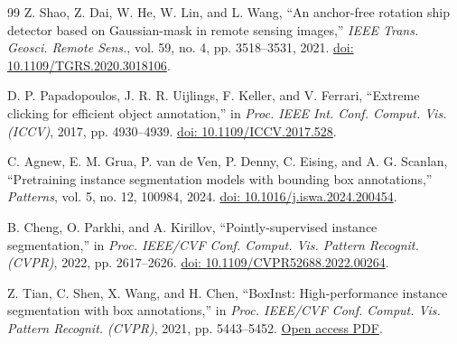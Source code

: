 \documentclass[twocolumn, 10pt]{article}
\begin{document}
\begin{thebibliography}{99}
Z. Shao, Z. Dai, W. He, W. Lin, and L. Wang, “An anchor-free rotation ship detector based on Gaussian-mask in remote sensing images,” \textit{IEEE Trans. Geosci. Remote Sens.}, vol. 59, no. 4, pp. 3518–3531, 2021. \href{https://doi.org/10.1109/TGRS.2020.3018106}{doi: 10.1109/TGRS.2020.3018106}.

D. P. Papadopoulos, J. R. R. Uijlings, F. Keller, and V. Ferrari, “Extreme clicking for efficient object annotation,” in \textit{Proc. IEEE Int. Conf. Comput. Vis. (ICCV)}, 2017, pp. 4930–4939. \href{https://doi.org/10.1109/ICCV.2017.528}{doi: 10.1109/ICCV.2017.528}.

C. Agnew, E. M. Grua, P. van de Ven, P. Denny, C. Eising, and A. G. Scanlan, “Pretraining instance segmentation models with bounding box annotations,” \textit{Patterns}, vol. 5, no. 12, 100984, 2024. \href{https://doi.org/10.1016/j.iswa.2024.200454 }{doi: 10.1016/j.iswa.2024.200454}.

B. Cheng, O. Parkhi, and A. Kirillov, “Pointly-supervised instance segmentation,” in \textit{Proc. IEEE/CVF Conf. Comput. Vis. Pattern Recognit. (CVPR)}, 2022, pp. 2617–2626. \href{https://doi.org/10.1109/CVPR52688.2022.00264}{doi: 10.1109/CVPR52688.2022.00264}.

Z. Tian, C. Shen, X. Wang, and H. Chen, “BoxInst: High-performance instance segmentation with box annotations,” in \textit{Proc. IEEE/CVF Conf. Comput. Vis. Pattern Recognit. (CVPR)}, 2021, pp. 5443–5452. \href{https://openaccess.thecvf.com/content/CVPR2021/papers/Tian_BoxInst_High-Performance_Instance_Segmentation_With_Box_Annotations_CVPR_2021_paper.pdf}{Open access PDF}.

\end{thebibliography}
\end{document}
